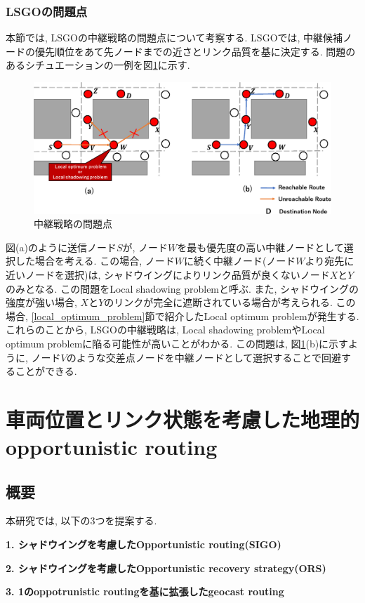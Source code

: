 \documentclass[10pt]{jreport}
\begin{document}
\subsection{LSGOの問題点}
本節では, LSGOの中継戦略の問題点について考察する. LSGOでは, 中継候補ノードの優先順位をあて先ノードまでの近さとリンク品質を基に決定する. 問題のあるシチュエーションの一例を図\ref{fig:LSGO-problem}に示す. 

\begin{figure}[!ht]
	\centering
	\includegraphics[width=160mm]{figures/LSGO_problem.eps}
	\caption{中継戦略の問題点}
	\label{fig:LSGO-problem}
\end{figure}

図(a)のように送信ノード$S$が, ノード$W$を最も優先度の高い中継ノードとして選択した場合を考える. この場合, ノード$W$に続く中継ノード(ノード$W$より宛先に近いノードを選択)は, シャドウイングによりリンク品質が良くないノード$X$と$Y$のみとなる. この問題をLocal shadowing problemと呼ぶ. また, シャドウイングの強度が強い場合, $X$と$Y$のリンクが完全に遮断されている場合が考えられる. この場合, \ref{local_optimum_problem}節で紹介したLocal optimum problemが発生する. これらのことから, LSGOの中継戦略は, Local shadowing problemやLocal optimum problemに陥る可能性が高いことがわかる. この問題は, 図\ref{fig:LSGO-problem}(b)に示すように, ノード$V$のような交差点ノードを中継ノードとして選択することで回避することができる. 





\chapter{車両位置とリンク状態を考慮した地理的opportunistic routing}
\label{Proposed}
\section{概要}
本研究では, 以下の3つを提案する. \par
\textbf{1. シャドウイングを考慮したOpportunistic routing(SIGO)} \par
\textbf{2. シャドウイングを考慮したOpportunistic recovery strategy(ORS)} \par
\textbf{3. 1のoppotrunistic routingを基に拡張したgeocast routing} \par
\end{document}
